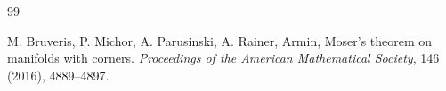\documentclass[12pt]{amsart}
\theoremstyle{definition}
\begin{document}
\begin{thebibliography} {99}


 M. Bruveris, P. Michor, A. Parusinski, A. Rainer, Armin, Moser's theorem on manifolds with corners. {\em Proceedings of the American Mathematical Society}, 146 (2016), 4889--4897. 















\end{thebibliography}
\end{document}
